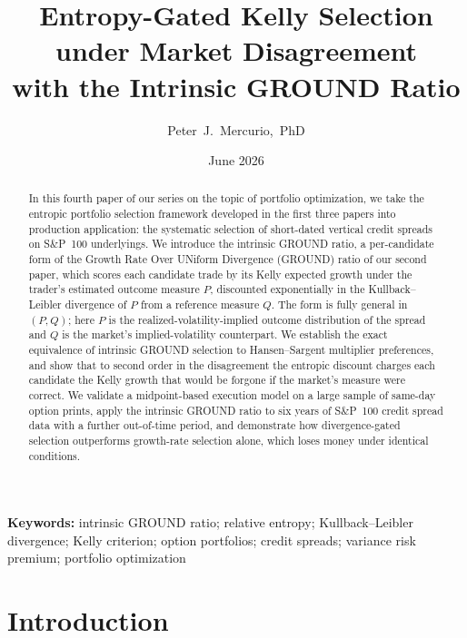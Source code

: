 \documentclass[11pt]{article}
\title{Entropy-Gated Kelly Selection under Market Disagreement\\
with the Intrinsic GROUND Ratio}
\author{Peter~J.~Mercurio,~PhD}
\date{June 2026}
\begin{document}
\maketitle

\begin{abstract}
In this fourth paper of our series on the topic of portfolio optimization, we
take the entropic portfolio selection framework developed in the first three
papers \cite{mercurio2020repo, mercurio2020binary, mercurio2020gepo} into
production application: the systematic selection of short-dated vertical
credit spreads on S\&P~100 underlyings. We introduce the intrinsic GROUND
ratio, a per-candidate form of the Growth Rate Over UNiform Divergence
(GROUND) ratio of our second paper, which scores each candidate trade by its
Kelly expected growth under the trader's estimated outcome measure $P$,
discounted exponentially in the Kullback--Leibler divergence of $P$ from a
reference measure $Q$. The form is fully general in $(P, Q)$; here $P$ is the
realized-volatility-implied outcome distribution of the spread and $Q$ is the
market's implied-volatility counterpart. We establish the exact equivalence
of intrinsic GROUND selection to Hansen--Sargent multiplier preferences, and
show that to second order in the disagreement the entropic discount charges
each candidate the Kelly growth that would be forgone if the market's
measure were correct. We validate a midpoint-based
execution model on a large sample of same-day option prints, apply the
intrinsic GROUND ratio to six years of S\&P~100 credit spread data with a
further out-of-time period, and demonstrate how divergence-gated selection
outperforms growth-rate selection alone, which loses money under identical
conditions.
\end{abstract}

\noindent\textbf{Keywords:} intrinsic GROUND ratio; relative entropy;
Kullback--Leibler divergence; Kelly criterion; option portfolios; credit
spreads; variance risk premium; portfolio optimization

\section{Introduction}
\end{document}
